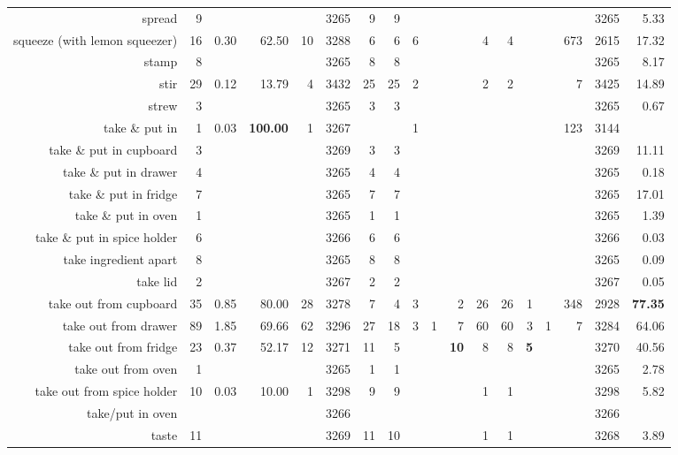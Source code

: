 \begin{tabular}{r r r@{\ \ }r@{\ \ }r@{\ \ }r@{\ \ }r r@{\ \ }r@{\ \ }r@{\ \ }r@{\ \ }r@{\ \ }r@{\ \ }r@{\ \ }r@{\ \ }r@{\ \ }r r}
spread & 9 &  &  &  & 3265 & 9 & 9 &  &  &  &  &  &  &  &  & 3265 & 5.33 \\
squeeze (with lemon squeezer) & 16 & 0.30 & 62.50 & 10 & 3288 & 6 & 6 & 6 &  &  & 4 & 4 &  &  & 673 & 2615 & 17.32 \\
stamp & 8 &  &  &  & 3265 & 8 & 8 &  &  &  &  &  &  &  &  & 3265 & 8.17 \\
stir & 29 & 0.12 & 13.79 & 4 & 3432 & 25 & 25 & 2 &  &  & 2 & 2 &  &  & 7 & 3425 & 14.89 \\
strew & 3 &  &  &  & 3265 & 3 & 3 &  &  &  &  &  &  &  &  & 3265 & 0.67 \\
take \& put in  & 1 & 0.03 & \textbf{100.00} & 1 & 3267 &  &  & 1 &  &  &  &  &  &  & 123 & 3144 &  \\
take \& put in cupboard & 3 &  &  &  & 3269 & 3 & 3 &  &  &  &  &  &  &  &  & 3269 & 11.11 \\
take \& put in drawer & 4 &  &  &  & 3265 & 4 & 4 &  &  &  &  &  &  &  &  & 3265 & 0.18 \\
take \& put in fridge & 7 &  &  &  & 3265 & 7 & 7 &  &  &  &  &  &  &  &  & 3265 & 17.01 \\
take \& put in oven & 1 &  &  &  & 3265 & 1 & 1 &  &  &  &  &  &  &  &  & 3265 & 1.39 \\
take \& put in spice holder & 6 &  &  &  & 3266 & 6 & 6 &  &  &  &  &  &  &  &  & 3266 & 0.03 \\
take ingredient apart & 8 &  &  &  & 3265 & 8 & 8 &  &  &  &  &  &  &  &  & 3265 & 0.09 \\
take lid & 2 &  &  &  & 3267 & 2 & 2 &  &  &  &  &  &  &  &  & 3267 & 0.05 \\
take out from cupboard & 35 & 0.85 & 80.00 & 28 & 3278 & 7 & 4 & 3 &  & 2 & 26 & 26 & 1 &  & 348 & 2928 & \textbf{77.35} \\
take out from drawer & 89 & 1.85 & 69.66 & 62 & 3296 & 27 & 18 & 3 & 1 & 7 & 60 & 60 & 3 & 1 & 7 & 3284 & 64.06 \\
take out from fridge & 23 & 0.37 & 52.17 & 12 & 3271 & 11 & 5 &  &  & \textbf{10} & 8 & 8 & \textbf{5} &  &  & 3270 & 40.56 \\
take out from oven & 1 &  &  &  & 3265 & 1 & 1 &  &  &  &  &  &  &  &  & 3265 & 2.78 \\
take out from spice holder & 10 & 0.03 & 10.00 & 1 & 3298 & 9 & 9 &  &  &  & 1 & 1 &  &  &  & 3298 & 5.82 \\
take/put in oven &  &  &  &  & 3266 &  &  &  &  &  &  &  &  &  &  & 3266 &  \\
taste & 11 &  &  &  & 3269 & 11 & 10 &  &  &  & 1 & 1 &  &  &  & 3268 & 3.89 \\

\end{tabular}
